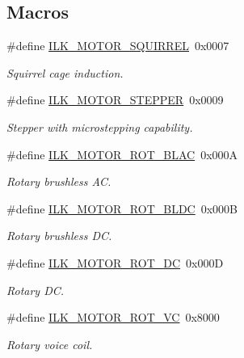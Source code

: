 \subsection*{Macros}
\begin{DoxyCompactItemize}
\item 
\#define \hyperlink{group__IL__CONST__MOTOR_ga5bdb2f869123533b63941efbb1a7aea3}{I\+L\+K\+\_\+\+M\+O\+T\+O\+R\+\_\+\+S\+Q\+U\+I\+R\+R\+EL}~0x0007
\begin{DoxyCompactList}\small\item\em Squirrel cage induction. \end{DoxyCompactList}\item 
\#define \hyperlink{group__IL__CONST__MOTOR_ga13f49aebf7a4d08b01a9c7aa00164ead}{I\+L\+K\+\_\+\+M\+O\+T\+O\+R\+\_\+\+S\+T\+E\+P\+P\+ER}~0x0009
\begin{DoxyCompactList}\small\item\em Stepper with microstepping capability. \end{DoxyCompactList}\item 
\#define \hyperlink{group__IL__CONST__MOTOR_ga9e363ce9fcb333f1a0ca43cf3e018de9}{I\+L\+K\+\_\+\+M\+O\+T\+O\+R\+\_\+\+R\+O\+T\+\_\+\+B\+L\+AC}~0x000A
\begin{DoxyCompactList}\small\item\em Rotary brushless AC. \end{DoxyCompactList}\item 
\#define \hyperlink{group__IL__CONST__MOTOR_ga1b190d9b607368d639ccfd6b61d27616}{I\+L\+K\+\_\+\+M\+O\+T\+O\+R\+\_\+\+R\+O\+T\+\_\+\+B\+L\+DC}~0x000B
\begin{DoxyCompactList}\small\item\em Rotary brushless DC. \end{DoxyCompactList}\item 
\#define \hyperlink{group__IL__CONST__MOTOR_ga1f7f2854dad7608e3f814d9409866ccc}{I\+L\+K\+\_\+\+M\+O\+T\+O\+R\+\_\+\+R\+O\+T\+\_\+\+DC}~0x000D
\begin{DoxyCompactList}\small\item\em Rotary DC. \end{DoxyCompactList}\item 
\#define \hyperlink{group__IL__CONST__MOTOR_ga7ce94e9b64195dad671ec5bc25938f78}{I\+L\+K\+\_\+\+M\+O\+T\+O\+R\+\_\+\+R\+O\+T\+\_\+\+VC}~0x8000
\begin{DoxyCompactList}\small\item\em Rotary voice coil. \end{DoxyCompactList}\item 

\end{DoxyCompactItemize}

